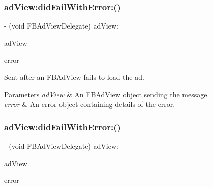 \subsubsection{\texorpdfstring{ad\+View\+:did\+Fail\+With\+Error\+:()}{adView:didFailWithError:()}\hspace{0.1cm}{\footnotesize\ttfamily [1/5]}}
{\footnotesize\ttfamily -\/ (void F\+B\+Ad\+View\+Delegate) ad\+View\+: \begin{DoxyParamCaption}\item[{(\hyperlink{interfaceFBAdView}{F\+B\+Ad\+View} $\ast$)}]{ad\+View }\item[{didFailWithError:(N\+S\+Error $\ast$)}]{error }\end{DoxyParamCaption}\hspace{0.3cm}{\ttfamily [optional]}}

Sent after an \hyperlink{interfaceFBAdView}{F\+B\+Ad\+View} fails to load the ad.


\begin{DoxyParams}{Parameters}
{\em ad\+View} & An \hyperlink{interfaceFBAdView}{F\+B\+Ad\+View} object sending the message. \\
\hline
{\em error} & An error object containing details of the error. \\
\hline
\end{DoxyParams}
\mbox{\label{protocolFBAdViewDelegate_01-p_a2fc4eecd46ddc75a41e925c9b07d25b8}} 
\subsubsection{\texorpdfstring{ad\+View\+:did\+Fail\+With\+Error\+:()}{adView:didFailWithError:()}\hspace{0.1cm}{\footnotesize\ttfamily [2/5]}}
{\footnotesize\ttfamily -\/ (void F\+B\+Ad\+View\+Delegate) ad\+View\+: \begin{DoxyParamCaption}\item[{(\hyperlink{interfaceFBAdView}{F\+B\+Ad\+View} $\ast$)}]{ad\+View }\item[{didFailWithError:(N\+S\+Error $\ast$)}]{error }\end{DoxyParamCaption}\hspace{0.3cm}{\ttfamily [optional]}}

